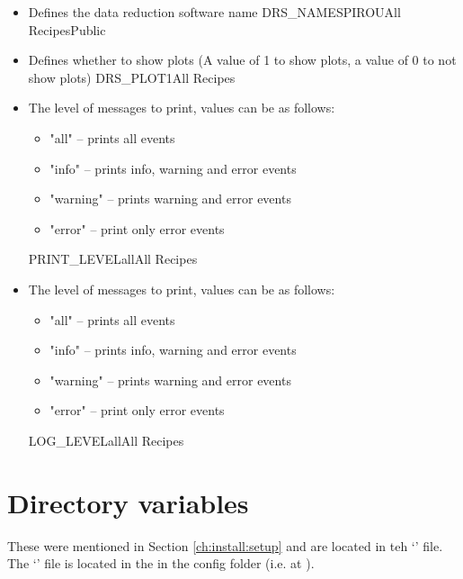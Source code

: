 \begin{itemize}

\item {}
{Defines the data reduction software name}
{DRS\_NAME}{SPIROU}{All Recipes}{\configtxtfile}{Public}

\item {}
{Defines whether to show plots (A value of 1 to show plots, a value of 0 to not show plots)}
{DRS\_PLOT}{1}{All Recipes}{\configtxtfile}

\item {}
{The level of messages to print, values can be as follows:
\begin{itemize}
	\item "all" -- prints all events
	\item "info" -- prints info, warning and error events
	\item "warning" -- prints warning and error events
	\item "error" -- print only error events
\end{itemize}
}
{PRINT\_LEVEL}{all}{All Recipes}{\configtxtfile}

\item {}
{The level of messages to print, values can be as follows:
\begin{itemize}
	\item "all" -- prints all events
	\item "info" -- prints info, warning and error events
	\item "warning" -- prints warning and error events
	\item "error" -- print only error events
\end{itemize}
}
{LOG\_LEVEL}{all}{All Recipes}{\configtxtfile}


\end{itemize}


\section{Directory variables}
\label{ch:variables:directory}

These were mentioned in Section \ref{ch:install:setup} and are located in teh `\configtxtfile' file. The `\configtxtfile' file is located in the \InstallDIR in the config folder (i.e. at ). \\

